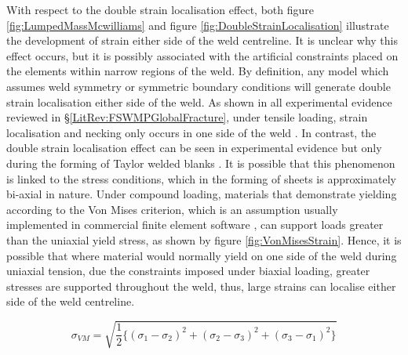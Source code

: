With respect to the double strain localisation effect, both figure \ref{fig:LumpedMassMcwilliams} and figure \ref{fig:DoubleStrainLocalisation} illustrate the development of strain either side of the weld centreline. It is unclear why this effect occurs, but it is possibly associated with the artificial constraints placed on the elements within narrow regions of the weld. By definition, any model which assumes weld symmetry or symmetric boundary conditions will generate double strain localisation either side of the weld. As shown in all experimental evidence reviewed in \S\ref{LitRev:FSWMPGlobalFracture}, under tensile loading, strain localisation and necking only occurs in one side of the weld \cite{Rhodes1997,Genevois2006}. In contrast, the double strain localisation effect can be seen in experimental evidence but only during the forming of Taylor welded blanks \cite{Zhao2001,Kim2010,Kim2010a}. It is possible that this phenomenon is linked to the stress conditions, which in the forming of sheets is approximately bi-axial in nature. Under compound loading, materials that demonstrate yielding according to the Von Mises criterion, which is an assumption usually implemented in commercial finite element software \cite{Hallquist2006,Systemes2010}, can support loads greater than the uniaxial yield stress, as shown by figure \ref{fig:VonMisesStrain}. Hence, it is possible that where material would normally yield on one side of the weld during uniaxial tension, due the constraints imposed under biaxial loading, greater stresses are supported throughout the weld, thus, large strains can localise either side of the weld centreline. %

\begin{equation}
\label{eq:LR46}
\sigma_{VM} =\sqrt{\frac{1}{2}\bigg\{(\sigma_{1} - \sigma_2)^2 + (\sigma_2 - \sigma_3)^2 + (\sigma_3 - \sigma_1)^2\bigg\}}
\end{equation}


